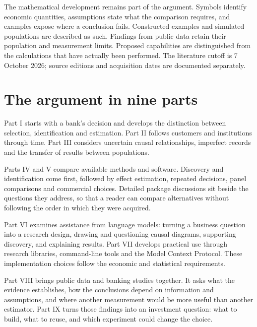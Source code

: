 The mathematical development remains part of the argument. Symbols identify
economic quantities, assumptions state what the comparison requires, and
examples expose where a conclusion fails. Constructed examples and simulated
populations are described as such. Findings from public data retain their
population and measurement limits. Proposed capabilities are distinguished
from the calculations that have actually been performed. The literature
cutoff is 7 October 2026; source editions and acquisition dates are documented
separately.

\chapter*{The argument in nine parts}

Part I starts with a bank's decision and develops the distinction between
selection, identification and estimation. Part II follows customers and
institutions through time. Part III considers uncertain causal relationships,
imperfect records and the transfer of results between populations.

Parts IV and V compare available methods and software. Discovery and
identification come first, followed by effect estimation, repeated decisions,
panel comparisons and commercial choices. Detailed package discussions sit
beside the questions they address, so that a reader can compare alternatives
without following the order in which they were acquired.

Part VI examines assistance from language models: turning a business question
into a research design, drawing and questioning causal diagrams, supporting
discovery, and explaining results. Part VII develops practical use through
research libraries, command-line tools and the Model Context Protocol. These
implementation choices follow the economic and statistical requirements.

Part VIII brings public data and banking studies together. It asks what the
evidence establishes, how the conclusions depend on information and assumptions,
and where another measurement would be more useful than another estimator.
Part IX turns those findings into an investment question: what to build, what
to reuse, and which experiment could change the choice.
